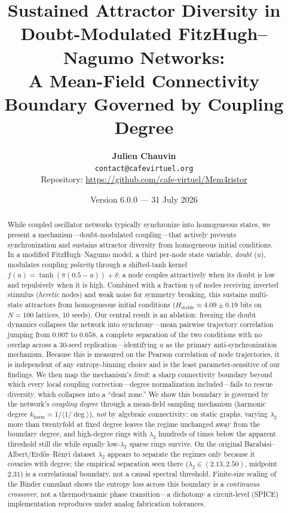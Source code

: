 ﻿\documentclass[11pt]{article}
\title{Sustained Attractor Diversity in Doubt-Modulated FitzHugh--Nagumo Networks:\\
A Mean-Field Connectivity Boundary Governed by Coupling Degree}
\author{
    \textbf{Julien Chauvin} \\
    \small{\texttt{contact@cafevirtuel.org}} \\
    \small{Repository: \url{https://github.com/cafe-virtuel/Mem4ristor}}
}
\date{Version 6.0.0 --- 31 July 2026}
\begin{document}
\maketitle

\begin{abstract}
While coupled oscillator networks typically synchronize into homogeneous states, we present a mechanism---doubt-modulated coupling---that actively prevents synchronization and sustains attractor diversity from homogeneous initial conditions. In a modified FitzHugh--Nagumo model, a third per-node state variable, \emph{doubt} ($u$), modulates coupling \emph{polarity} through a shifted-tanh kernel $f(u) = \tanh(\pi(0.5-u)) + \delta$: a node couples attractively when its doubt is low and repulsively when it is high. Combined with a fraction $\eta$ of nodes receiving inverted stimulus (\emph{heretic} nodes) and weak noise for symmetry breaking, this sustains multi-state attractors from homogeneous initial conditions ($H_{\text{stable}} \approx 4.09 \pm 0.19$ bits on $N = 100$ lattices, 10 seeds). Our central result is an ablation: freezing the doubt dynamics collapses the network into synchrony---mean pairwise trajectory correlation jumping from $0.007$ to $0.658$, a complete separation of the two conditions with no overlap across a 30-seed replication---identifying $u$ as the primary anti-synchronization mechanism. Because this is measured on the Pearson correlation of node trajectories, it is independent of any entropy-binning choice and is the least parameter-sensitive of our findings. We then map the mechanism's \emph{limit}: a sharp connectivity boundary beyond which every local coupling correction---degree normalization included---fails to rescue diversity, which collapses into a ``dead zone.'' We show this boundary is governed by the network's \emph{coupling degree} through a mean-field sampling mechanism (harmonic degree $k_{\mathrm{harm}} = 1/\langle 1/\deg\rangle$), \emph{not} by algebraic connectivity: on static graphs, varying $\lambda_2$ more than twentyfold at fixed degree leaves the regime unchanged away from the boundary degree, and high-degree rings with $\lambda_2$ hundreds of times below the apparent threshold still die while equally low-$\lambda_2$ sparse rings survive. On the original Barab\'asi--Albert/Erd\H{o}s--R\'enyi dataset $\lambda_2$ appears to separate the regimes only because it covaries with degree; the empirical separation seen there ($\lambda_2 \in (2.13, 2.50)$, midpoint $2.31$) is a correlational boundary, not a causal spectral threshold. Finite-size scaling of the Binder cumulant shows the entropy loss across this boundary is a \emph{continuous crossover}, not a thermodynamic phase transition---a dichotomy a circuit-level (SPICE) implementation reproduces under analog fabrication tolerances.
\end{abstract}
\end{document}
